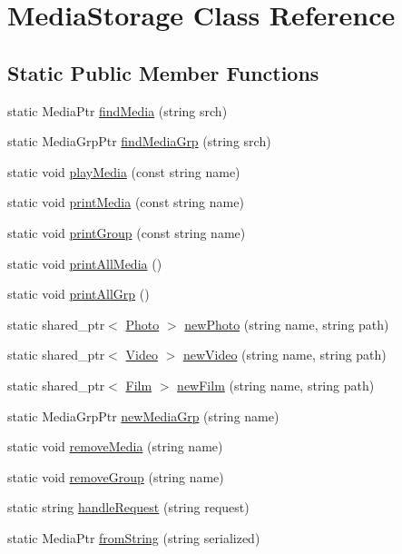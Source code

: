 \hypertarget{classMediaStorage}{}\section{Media\+Storage Class Reference}
\label{classMediaStorage}
\subsection*{Static Public Member Functions}
\begin{DoxyCompactItemize}
\item 
static Media\+Ptr \hyperlink{classMediaStorage_afd1c58d3d41cf932b0b091d346726996}{find\+Media} (string srch)
\item 
static Media\+Grp\+Ptr \hyperlink{classMediaStorage_afbc1491a61445a0fa70c69e4c78be356}{find\+Media\+Grp} (string srch)
\item 
static void \hyperlink{classMediaStorage_a53a717cd521376ef1d38bba485fff218}{play\+Media} (const string name)
\item 
static void \hyperlink{classMediaStorage_ac9f6b5047a11a5123c09885155cff2e0}{print\+Media} (const string name)
\item 
static void \hyperlink{classMediaStorage_abf9dcfa0c6647f32816f3cab13eb325b}{print\+Group} (const string name)
\item 
static void \hyperlink{classMediaStorage_a38497104de3ebadf0968e55e29b7e7ef}{print\+All\+Media} ()
\item 
static void \hyperlink{classMediaStorage_aad266fb25546eee62037193b533ac10a}{print\+All\+Grp} ()
\item 
static shared\+\_\+ptr$<$ \hyperlink{classPhoto}{Photo} $>$ \hyperlink{classMediaStorage_a22db05b2288f4ea728506fa632205335}{new\+Photo} (string name, string path)
\item 
static shared\+\_\+ptr$<$ \hyperlink{classVideo}{Video} $>$ \hyperlink{classMediaStorage_aec1d47d5d30f17bdb6ae443e464c4bd4}{new\+Video} (string name, string path)
\item 
static shared\+\_\+ptr$<$ \hyperlink{classFilm}{Film} $>$ \hyperlink{classMediaStorage_a55db96df35aae1348581b6fbc27a34bc}{new\+Film} (string name, string path)
\item 
static Media\+Grp\+Ptr \hyperlink{classMediaStorage_a0762b1452654e6d47fa93d7ad5001520}{new\+Media\+Grp} (string name)
\item 
static void \hyperlink{classMediaStorage_ae0c7f77a76c3496bfea91145ebd4acc5}{remove\+Media} (string name)
\item 
static void \hyperlink{classMediaStorage_a295d0fe139b82b0fbb351e17ee7759dd}{remove\+Group} (string name)
\item 
static string \hyperlink{classMediaStorage_a93e1a78d314ecb11e1024c322fa670f3}{handle\+Request} (string request)
\item 
static Media\+Ptr \hyperlink{classMediaStorage_a9a5a91b418dd9da61ca394f789c557fb}{from\+String} (string serialized)
\end{DoxyCompactItemize}


